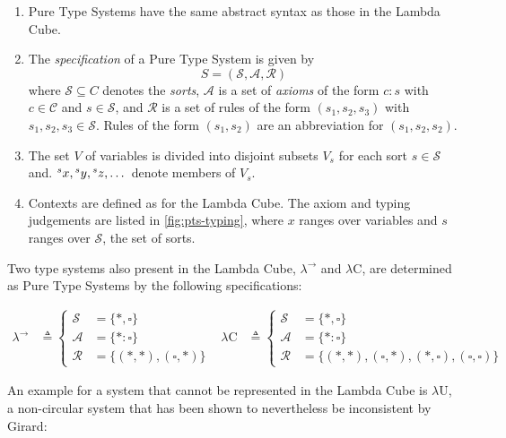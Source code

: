 \documentclass[12pt,toc=bibliography,numbers=noendperiod,
               footnotes=multiple,twoside]{scrartcl}
\begin{document}
\begin{enumerate}
\item Pure Type Systems have the same abstract syntax as those in the Lambda Cube.
\item The \emph{specification} of a Pure Type System is given by \[S = (\mathcal{S}, \mathcal{A}, \mathcal{R})\] where \(\mathcal{S} \subseteq C\) denotes the \emph{sorts}, \(\mathcal{A}\) is a set of \emph{axioms} of the form \(c:s\) with \(c \in \mathcal{C}\) and \(s \in \mathcal{S}\), and \(\mathcal{R}\) is a set of rules of the form \((s_1, s_2, s_3)\) with \(s_1, s_2, s_3 \in \mathcal{S}\). Rules of the form \((s_1, s_2)\) are an abbreviation for \((s_1, s_2, s_2)\).
\item The set \(V\) of variables is divided into disjoint subsets \(V_s\) for each sort \(s \in \mathcal{S}\) and. \(\prescript{s}{}x, \prescript{s}{}y, \prescript{s}{}z, \dots\) denote members of \(V_s\).
\item Contexts are defined as for the Lambda Cube. The axiom and typing judgements are listed in \cref{fig:pts-typing}, where \(x\) ranges over variables and \(s\) ranges over \(\mathcal{S}\), the set of sorts.
\end{enumerate}

Two type systems also present in the Lambda Cube, \(\lambda^{\rightarrow}\) and \(\lambda\textrm{C}\), are determined as Pure Type Systems by the following specifications:

\begin{align*}
\lambda^{\rightarrow} &\triangleq
    \begin{cases}
        \mathcal{S} &= \{*,\square\} \\
        \mathcal{A} &= \{*:\square\} \\
        \mathcal{R} &= \{(*,*),(\square,*)\}
    \end{cases} &
\lambda\textrm{C} &\triangleq
    \begin{cases}
        \mathcal{S} &= \{*,\square\} \\
        \mathcal{A} &= \{*:\square\} \\
        \mathcal{R} &= \{(*,*),(\square,*),(*,\square),(\square,\square)\}
    \end{cases}
\end{align*}

An example for a system that cannot be represented in the Lambda Cube is \(\lambda\textrm{U}\), a non-circular system that has been shown to nevertheless be inconsistent by Girard:
\end{document}
